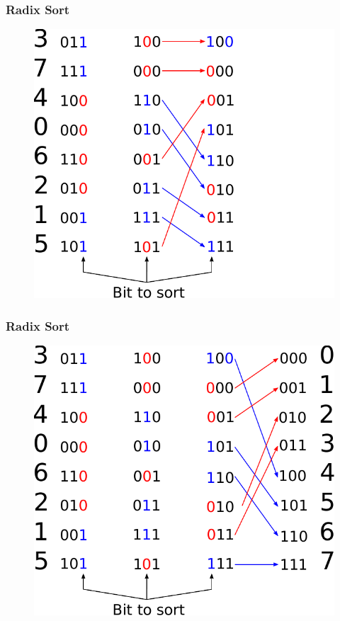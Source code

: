\documentclass[aspectratio=169,handout]{beamer}
\begin{document}
\frame
{
	\frametitle{Radix Sort}
	\begin{figure}
		\centering
		\includegraphics[height=0.7\textheight]{radix2}
	\end{figure}
}

\frame
{
	\frametitle{Radix Sort}
	\begin{figure}
		\centering
		\includegraphics[height=0.7\textheight]{radix3}
	\end{figure}
}
\end{document}
